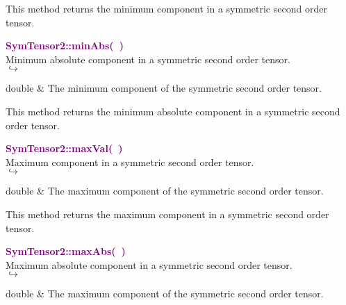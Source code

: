 This method returns the minimum component in a symmetric second order tensor.

\textcolor{purple}{\textbf{SymTensor2::minAbs(~)}}\label{SymTensor2::minAbs()}\\
Minimum absolute component in a symmetric second order tensor.\\ \hspace*{5mm}$\hookrightarrow$
\vspace*{-2em}\begin{tcolorbox}[grow to left by=-1cm, width=\textwidth-1cm,myArgs,tabularx={l|R}]
double & The minimum component of the symmetric second order tensor.
\end{tcolorbox}

This method returns the minimum absolute component in a symmetric second order tensor.

\textcolor{purple}{\textbf{SymTensor2::maxVal(~)}}\label{SymTensor2::maxVal()}\\
Maximum component in a symmetric second order tensor.\\ \hspace*{5mm}$\hookrightarrow$
\vspace*{-2em}\begin{tcolorbox}[grow to left by=-1cm, width=\textwidth-1cm,myArgs,tabularx={l|R}]
double & The maximum component of the symmetric second order tensor.
\end{tcolorbox}

This method returns the maximum component in a symmetric second order tensor.

\textcolor{purple}{\textbf{SymTensor2::maxAbs(~)}}\label{SymTensor2::maxAbs()}\\
Maximum absolute component in a symmetric second order tensor.\\ \hspace*{5mm}$\hookrightarrow$
\vspace*{-2em}\begin{tcolorbox}[grow to left by=-1cm, width=\textwidth-1cm,myArgs,tabularx={l|R}]
double & The maximum component of the symmetric second order tensor.
\end{tcolorbox}

